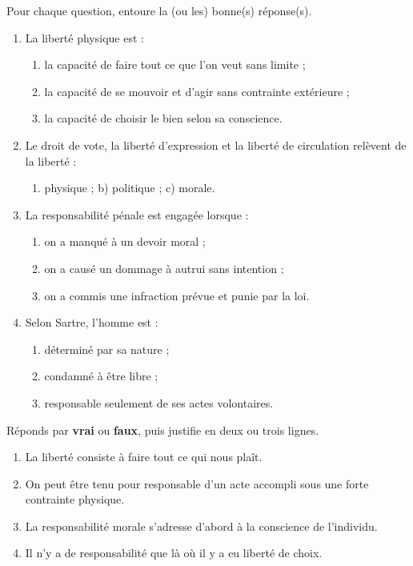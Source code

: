 \documentclass[11pt]{article}
\begin{document}
\begin{exercice}
Pour chaque question, entoure la (ou les) bonne(s) réponse(s).
\begin{enumerate}
\item La liberté physique est :
\begin{enumerate}
\item[a)] la capacité de faire tout ce que l'on veut sans limite ;
\item[b)] la capacité de se mouvoir et d'agir sans contrainte extérieure ;
\item[c)] la capacité de choisir le bien selon sa conscience.
\end{enumerate}
\item Le droit de vote, la liberté d'expression et la liberté de circulation relèvent de la liberté :
\begin{enumerate}
\item[a)] physique ; \quad b) politique ; \quad c) morale.
\end{enumerate}
\item La responsabilité pénale est engagée lorsque :
\begin{enumerate}
\item[a)] on a manqué à un devoir moral ;
\item[b)] on a causé un dommage à autrui sans intention ;
\item[c)] on a commis une infraction prévue et punie par la loi.
\end{enumerate}
\item Selon Sartre, l'homme est :
\begin{enumerate}
\item[a)] déterminé par sa nature ;
\item[b)] condamné à être libre ;
\item[c)] responsable seulement de ses actes volontaires.
\end{enumerate}
\end{enumerate}
\end{exercice}

\begin{exercice}
Réponds par \textbf{vrai} ou \textbf{faux}, puis justifie en deux ou trois lignes.
\begin{enumerate}
\item La liberté consiste à faire tout ce qui nous plaît.
\item On peut être tenu pour responsable d'un acte accompli sous une forte contrainte physique.
\item La responsabilité morale s'adresse d'abord à la conscience de l'individu.
\item Il n'y a de responsabilité que là où il y a eu liberté de choix.
\end{enumerate}
\end{exercice}
\end{document}
